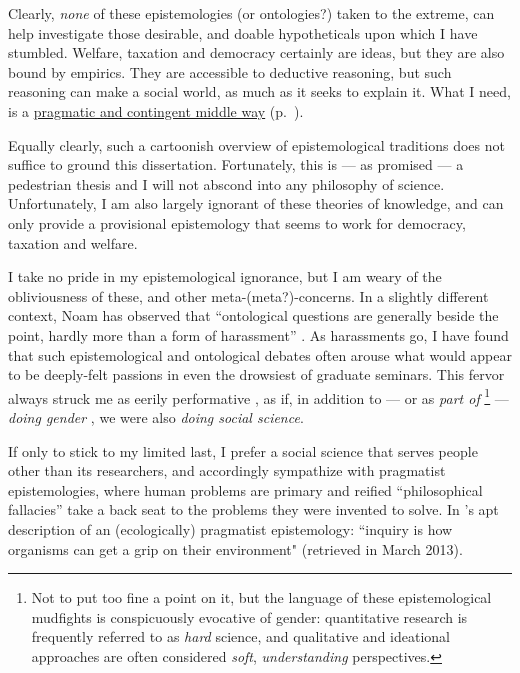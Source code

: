 
Clearly, \emph{none} of these epistemologies (or ontologies?) taken to the extreme, can help investigate those desirable, and doable hypotheticals upon which I have stumbled.
Welfare, taxation and democracy certainly are ideas, but they are also bound by empirics.
They are accessible to deductive reasoning, but such reasoning can make a social world, as much as it seeks to explain it.
What I need, is a \hyperref[sec:epistemology]{pragmatic and contingent middle way} (p.~\pageref{sec:epistemology}).

Equally clearly, such a cartoonish overview of epistemological traditions does not suffice to ground this dissertation.
Fortunately, this is --- as promised --- a pedestrian thesis and I will not abscond into any philosophy of science.
Unfortunately, I am also largely ignorant of these theories of knowledge, and can only provide a provisional epistemology that seems to work for democracy, taxation and welfare.

I take no pride in my epistemological ignorance, but I am weary of the obliviousness of these, and other meta-(meta?)-concerns.
In a slightly different context, Noam \citeauthor{Chomsky1997} has observed that ``ontological questions are generally beside the point, hardly more than a form of harassment'' \citeyearpar[132]{Chomsky1997}.
As harassments go, I have found that such epistemological and ontological debates often arouse what would appear to be deeply-felt passions in even the drowsiest of graduate seminars.
This fervor always struck me as eerily performative \cite[compare][]{Goffman1959,Butler1997}, as if, in addition to --- or as \emph{part of}
\footnote{
	Not to put too fine a point on it, but the language of these epistemological mudfights is conspicuously evocative of gender:
	quantitative research is frequently referred to as \emph{hard} science, and qualitative and ideational approaches are often considered \emph{soft}, \emph{understanding} perspectives.
}
--- \emph{doing gender} \citep{West1987}, we were also \emph{doing social science}.

If only to stick to my limited last, I prefer a social science that serves people other than its researchers, and accordingly sympathize with pragmatist epistemologies, where human problems are primary and reified ``philosophical fallacies'' \citep{Dewey1929} take a back seat to the problems they were invented to solve.
In \citeauthor{Wikipedia2013}'s apt description of an (ecologically) pragmatist epistemology:
``inquiry is how organisms can get a grip on their environment" (retrieved in March 2013).

